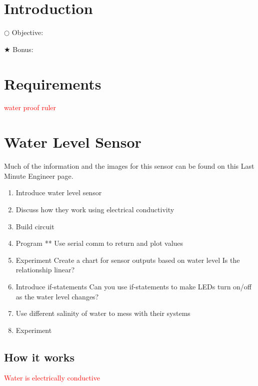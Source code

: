 \documentclass[12pt]{article}
\begin{document}

\section{Introduction}


\noindent $\bigcirc$ Objective: 

\noindent $\bigstar$ Bonus: 


\section{Requirements}

\textcolor{red}{water proof ruler}

\section{Water Level Sensor}

Much of the information and the images for this sensor can be found on this Last Minute Engineer page\cite{LME_water_sensor}.

\begin{enumerate}
	\itemsep -1em
	\item Introduce water level sensor
	\item Discuss how they work using electrical conductivity
	\item Build circuit
	\item Program **
	\subitem Use serial comm to return and plot values
	
	\item Experiment
	\subitem Create a chart for sensor outputs based on water level
	\subitem Is the relationship linear?
	
	\item Introduce if-statements
	\subitem Can you use if-statements to make LEDs turn on/off as the water level changes?
	
	\item Use different salinity of water to mess with their systems
	
	\item Experiment
	\subitem 
	
\end{enumerate}

\subsection{How it works}

\textcolor{red}{Water is electrically conductive}
\end{document}
